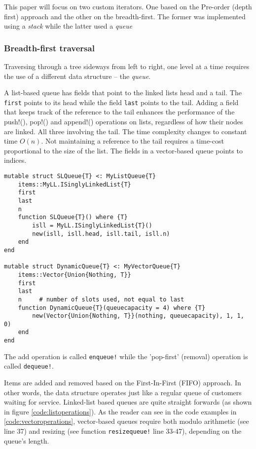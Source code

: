 \documentclass[a4paper, 11pt]{article}
\begin{document}
    This paper will focus on two custom iterators. 
    One based on the Pre-order (depth first) approach
    and the other on the breadth-first. 
    The former was implemented using a \emph{stack} while the latter
    used a \emph{queue}

\clearpage    
    \subsubsection*{Breadth-first traversal}
    Traversing through a tree sideways from left to right, one level at a time requires 
    the use of a different data structure -- the \emph{queue}. 

    A list-based queue has fields that point to the linked lists head and a tail. The
    \texttt{first} points to its head while the field
    \texttt{last} points to the tail. 
    Adding a field that keeps track of the reference to the tail enhances the 
    performance of the push!(), pop!() and append!() operations on lists, 
    regardless of how their nodes are linked. All three involving the tail. 
    The time complexity changes to constant time
    $O(n)$.  Not maintaining a reference to the tail requires a time-cost proportional to the 
    size of the list. The fields in a vector-based queue points to indices. 
    \begin{verbatim}
mutable struct SLQueue{T} <: MyListQueue{T}
    items::MyLL.ISinglyLinkedList{T}
    first
    last
    n
    function SLQueue{T}() where {T}
        isll = MyLL.ISinglyLinkedList{T}()
        new(isll, isll.head, isll.tail, isll.n)
    end
end

mutable struct DynamicQueue{T} <: MyVectorQueue{T}
    items::Vector{Union{Nothing, T}}
    first
    last
    n     # number of slots used, not equal to last
    function DynamicQueue{T}(queuecapacity = 4) where {T}
        new(Vector{Union{Nothing, T}}(nothing, queuecapacity), 1, 1, 0)
    end
end

    \end{verbatim}
The add operation is called \texttt{enqueue!} while the 'pop-first'
(removal) operation is called \texttt{dequeue!}. 

Items are added and removed based on the First-In-First (FIFO) approach. 
In other words, the data structure operates just like a regular queue of
customers waiting for service. 
Linked-list based queues are quite straight forwards 
(as shown in figure \autoref{code:listoperations}).
As the reader can see in the code examples in
\autoref{code:vectoroperations}, vector-based queues require both modulo
arithmetic (see line 37) and resizing 
(see function \texttt{resizequeue!} line 33-47), 
depending on the queue's length.
\end{document}
